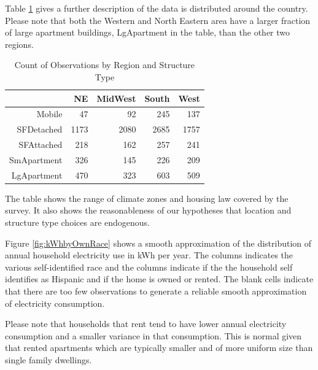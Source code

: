 \documentclass{article}
\begin{document}
Table
\ref{tab:RegionVStruct}
gives a further description of the data is distributed around the country.  Please note that both the Western and North Eastern area have a larger fraction of large apartment buildings, LgApartment in the table, than the other two regions. 


\begin{table}[ht]
\centering
\caption{Count of Observations by Region and Structure Type} 
\label{tab:RegionVStruct}
{\small
\begin{tabular}{rrrrr}
  \hline
 & NE & MidWest & South & West \\ 
  \hline
Mobile &  47 &  92 & 245 & 137 \\ 
  SFDetached & 1173 & 2080 & 2685 & 1757 \\ 
  SFAttached & 218 & 162 & 257 & 241 \\ 
  SmApartment & 326 & 145 & 226 & 209 \\ 
  LgApartment & 470 & 323 & 603 & 509 \\ 
   \hline
\end{tabular}
}
\end{table}
The table shows the range of climate zones and housing law covered by the survey.  It also shows the reasonableness of our hypotheses that location and structure type choices are endogenous.

Figure
\ref{fig:kWhbyOwnRace}
shows a smooth approximation of the distribution of annual household electricity use in kWh per year.  The columns indicates the various self-identified race and the columns indicate if the the household self identifies as Hispanic and if the home is owned or rented. The blank cells indicate that there are too few observations to generate a reliable smooth approximation of electricity consumption.

Please note that households that rent tend to have lower annual electricity consumption and a smaller variance in that consumption.  This is normal given that rented apartments which are typically smaller and of more uniform size than single family dwellings.  
\end{document}
